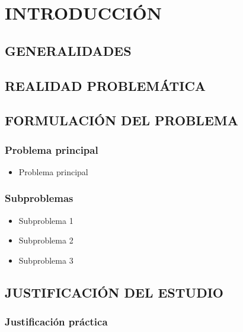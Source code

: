 \chapter{INTRODUCCIÓN}


\section{GENERALIDADES}

\lipsum[1]



\section{REALIDAD PROBLEMÁTICA}

\lipsum[3]


\section{FORMULACIÓN DEL PROBLEMA}

\subsection{Problema principal}

\begin{itemize}
    \item Problema principal
\end{itemize}

\subsection{Subproblemas}

\begin{itemize}
    \item Subproblema 1
    \item Subproblema 2
    \item Subproblema 3
\end{itemize}


\section{JUSTIFICACIÓN DEL ESTUDIO}

\subsection{Justificación práctica}

